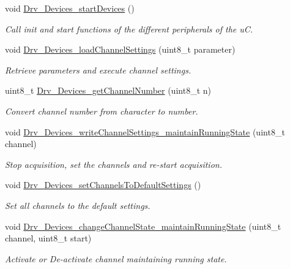 \begin{DoxyCompactItemize}
void \hyperlink{group___devices___library_ga752ca1b164444c691ffe54ed89d848c8}{Drv\+\_\+\+Devices\+\_\+start\+Devices} ()
\begin{DoxyCompactList}\small\item\em Call init and start functions of the different peripherals of the u\+C. \end{DoxyCompactList}\item 
void \hyperlink{group___devices___library_ga1b75ac5dd3eb55ef54cff5de501875a9}{Drv\+\_\+\+Devices\+\_\+load\+Channel\+Settings} (uint8\+\_\+t parameter)
\begin{DoxyCompactList}\small\item\em Retrieve parameters and execute channel settings. \end{DoxyCompactList}\item 
uint8\+\_\+t \hyperlink{group___devices___library_ga648ce331709a942df57efd5b8645db13}{Drv\+\_\+\+Devices\+\_\+get\+Channel\+Number} (uint8\+\_\+t n)
\begin{DoxyCompactList}\small\item\em Convert channel number from character to number. \end{DoxyCompactList}\item 
void \hyperlink{group___devices___library_gafd94e72e2e363f075a57a091e26424b2}{Drv\+\_\+\+Devices\+\_\+write\+Channel\+Settings\+\_\+maintain\+Running\+State} (uint8\+\_\+t channel)
\begin{DoxyCompactList}\small\item\em Stop acquisition, set the channels and re-\/start acquisition. \end{DoxyCompactList}\item 
void \hyperlink{group___devices___library_gaa48520ff061081dab8c49d26bf9404dd}{Drv\+\_\+\+Devices\+\_\+set\+Channels\+To\+Default\+Settings} ()
\begin{DoxyCompactList}\small\item\em Set all channels to the default settings. \end{DoxyCompactList}\item 
void \hyperlink{group___devices___library_gacf4dbff760e8426996f21c8a68d77cef}{Drv\+\_\+\+Devices\+\_\+change\+Channel\+State\+\_\+maintain\+Running\+State} (uint8\+\_\+t channel, uint8\+\_\+t start)
\begin{DoxyCompactList}\small\item\em Activate or De-\/activate channel maintaining running state. \end{DoxyCompactList}\item 

\end{DoxyCompactItemize}
